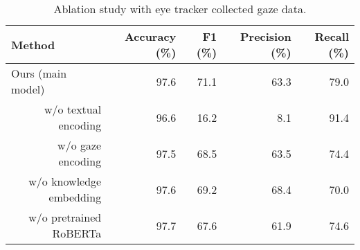 \begin{table*}[]
\caption{Ablation study with eye tracker collected gaze data.}
\label{tab:ablation}
\begin{tabular}{@{}rrrrr@{}}
\toprule
\multicolumn{1}{l}{Method}     & Accuracy (\%) & F1 (\%)   & Precision (\%) & Recall (\%) \\ \midrule
\multicolumn{1}{l}{Ours (main model)} & 97.6     & 71.1 & 63.3      & 79.0   \\ \midrule
w/o textual encoding        & 96.6     & 16.2 & 8.1      & 91.4   \\
w/o gaze encoding              & 97.5     & 68.5 & 63.5     & 74.4  \\
w/o knowledge embedding        & 97.6     & 69.2 & 68.4    &  70.0  \\
w/o pretrained RoBERTa        & 97.7     & 67.6 & 61.9    &  74.6  \\ \bottomrule
\end{tabular}
\end{table*}